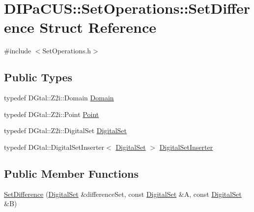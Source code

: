 \hypertarget{structDIPaCUS_1_1SetOperations_1_1SetDifference}{}\section{D\+I\+Pa\+C\+US\+:\+:Set\+Operations\+:\+:Set\+Difference Struct Reference}
\label{structDIPaCUS_1_1SetOperations_1_1SetDifference}


{\ttfamily \#include $<$Set\+Operations.\+h$>$}

\subsection*{Public Types}
\begin{DoxyCompactItemize}
\item 
typedef D\+Gtal\+::\+Z2i\+::\+Domain \mbox{\hyperlink{structDIPaCUS_1_1SetOperations_1_1SetDifference_aed21483576b1d6d75f3ca062d7ee15ad}{Domain}}
\item 
typedef D\+Gtal\+::\+Z2i\+::\+Point \mbox{\hyperlink{structDIPaCUS_1_1SetOperations_1_1SetDifference_acb0cc5c28b3744944fe56e7e765924e8}{Point}}
\item 
typedef D\+Gtal\+::\+Z2i\+::\+Digital\+Set \mbox{\hyperlink{structDIPaCUS_1_1SetOperations_1_1SetDifference_aeaafa3335e3f7cb0918a015a64b711ac}{Digital\+Set}}
\item 
typedef D\+Gtal\+::\+Digital\+Set\+Inserter$<$ \mbox{\hyperlink{structDIPaCUS_1_1SetOperations_1_1SetDifference_aeaafa3335e3f7cb0918a015a64b711ac}{Digital\+Set}} $>$ \mbox{\hyperlink{structDIPaCUS_1_1SetOperations_1_1SetDifference_afe08001f4fe897aac27e228317451c14}{Digital\+Set\+Inserter}}
\end{DoxyCompactItemize}
\subsection*{Public Member Functions}
\begin{DoxyCompactItemize}
\item 
\mbox{\hyperlink{structDIPaCUS_1_1SetOperations_1_1SetDifference_ae616c273fb711dcd2a982e06034b1967}{Set\+Difference}} (\mbox{\hyperlink{structDIPaCUS_1_1SetOperations_1_1SetDifference_aeaafa3335e3f7cb0918a015a64b711ac}{Digital\+Set}} \&difference\+Set, const \mbox{\hyperlink{structDIPaCUS_1_1SetOperations_1_1SetDifference_aeaafa3335e3f7cb0918a015a64b711ac}{Digital\+Set}} \&A, const \mbox{\hyperlink{structDIPaCUS_1_1SetOperations_1_1SetDifference_aeaafa3335e3f7cb0918a015a64b711ac}{Digital\+Set}} \&B)
\end{DoxyCompactItemize}


